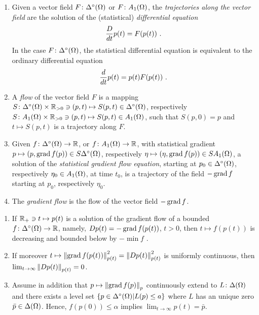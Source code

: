 \documentclass[12pt,a4paper]{amsart}
\begin{document}
\begin{definition}[Flow]
\begin{enumerate}
\item Given a vector field $F \colon \oSimO$ or $F \colon \AffineO$, the \emph{trajectories along the vector field} are the solution of the (statistical) \emph{differential equation}
%
  \begin{equation*}
    \Derivby t p(t) = F(p(t)) \ .
  \end{equation*}
%
In the case $F \colon \oSimO$, the statistical differential equation is equivalent to the ordinary differential equation
%
\begin{equation*}
  \derivby t p(t) = p(t)F(p(t)) \ .
\end{equation*}
\item A \emph{flow} of the vector field $F$ is a mapping $S \colon \oSimO \times \posreals \ni (p,t) \mapsto S(p,t) \in \oSimO$, respectively $S \colon \AffineO \times \posreals \ni (p,t) \mapsto S(p,t) \in \AffineO$, such that $S(p,0) = p$ and $t \mapsto S(p,t)$ is a trajectory along $F$.
\item
Given $f \colon \oSimO \to \reals$, or $f \colon \AffineO \to \reals$, with statistical gradient $p \mapsto (p,\grad f(p)) \in \SoSimO$, respectively $\eta \mapsto (\eta,\grad f(p)) \in \SAffineO$, a solution of the \emph{statistical gradient flow equation}, starting at $p_0 \in \oSimO$, respectively $\eta_0 \in \AffineO$, at time $t_0$, is a trajectory of the field $- \grad f$ starting at $p_0$, respectively $\eta_0$.
\item
The \emph{gradient flow} is the flow of the vector field $- \grad f$.
\end{enumerate}
\end{definition}

\begin{proposition}
\begin{enumerate}
\item
  If $\reals_+ \ni t \mapsto p(t)$ is a solution of the gradient flow of a bounded $f \colon \oSimO \to \reals$, namely, $Dp(t) = -\grad f(p(t))$, $t > 0$, then $t \mapsto f(p(t))$ is decreasing and bounded below by $- \min f$ . 
\item If moreover $t \mapsto \normat {p(t)} {\grad f(p(t))} ^2 = \normat {p(t)} {Dp(t)} ^2$ is uniformly continuous, then $\lim_{t \to \infty} \normat {p(t)} {Dp(t)} = 0$. 
\item Assume in addition that $p \mapsto \normat p {\grad f(p)}$ continuously extend to $L \colon \SimO$ and there exists a level set $\setof{p \in \oSimO}{L(p) \le a}$ where $L$ has an unique zero $\bar p \in \SimO$. Hence, $f(p(0)) \le \alpha$ implies $\lim_{t\to\infty} p(t) = \bar p$.
\end{enumerate}
\end{proposition}
\end{document}
